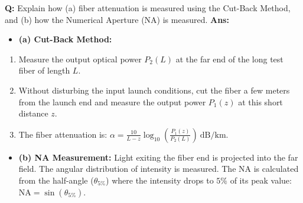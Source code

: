 \documentclass[10pt,a4paper,twocolumn]{article}
\begin{document}
\begin{tcolorbox}[
  colback=white,
  colframe=UnitColorThree,
  colbacktitle=gray!10!white,
  coltitle=black,
  fonttitle=\bfseries\sffamily\small,
  title={Unit III $\bullet$ Card 9: Fiber Measurement Techniques},
  boxrule=1.2pt,
  arc=2mm,
  outer arc=2mm,
  boxsep=1.5mm,
  top=1mm,
  bottom=1mm,
  left=1.5mm,
  right=1.5mm,
  before skip=2.5mm,
  after skip=2.5mm
]
\textbf{Q:} Explain how (a) fiber attenuation is measured using the Cut-Back Method, and (b) how the Numerical Aperture (NA) is measured.
\tcbline
\textbf{Ans:} \begin{itemize}
  \item   \textbf{(a) Cut-Back Method:}
\end{itemize}
\begin{enumerate}
  \item Measure the output optical power $P_2(L)$ at the far end of the long test fiber of length $L$.
  \item Without disturbing the input launch conditions, cut the fiber a few meters from the launch end and measure the output power $P_1(z)$ at this short distance $z$.
  \item The fiber attenuation is: $\alpha = \frac{10}{L-z} \log_{10}\left(\frac{P_1(z)}{P_2(L)}\right)\ \text{dB/km}$.
\end{enumerate}
\begin{itemize}
  \item   \textbf{(b) NA Measurement:} Light exiting the fiber end is projected into the far field. The angular distribution of intensity is measured. The NA is calculated from the half-angle ($\theta_{5\%}$) where the intensity drops to $5\%$ of its peak value: $\text{NA} = \sin(\theta_{5\%})$.
\end{itemize}
\end{tcolorbox}
\end{document}
